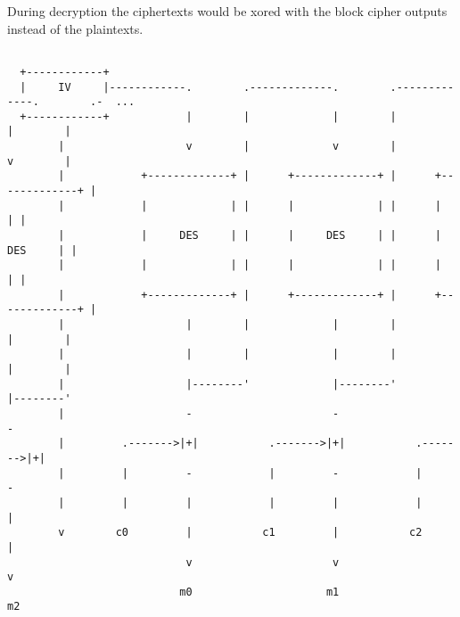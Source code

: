 \documentclass{article}
\begin{document}
\normalsize
During decryption the ciphertexts would be xored with the block cipher outputs instead of the plaintexts.
\small
\begin{verbatim}

  +------------+                                                   
  |     IV     |------------.        .-------------.        .-------------.        .-  ...                                                                      
  +------------+            |        |             |        |             |        |                                                    
        |                   v        |             v        |             v        |                                                      
        |            +-------------+ |      +-------------+ |      +-------------+ |                                                
        |            |             | |      |             | |      |             | |                                                    
        |            |     DES     | |      |     DES     | |      |     DES     | |                                                      
        |            |             | |      |             | |      |             | |                                                    
        |            +-------------+ |      +-------------+ |      +-------------+ |                                                  
        |                   |        |             |        |             |        |                                                   
        |                   |        |             |        |             |        |                                                   
        |                   |--------'             |--------'             |--------'                                                   
        |                   -                      -                      -                                                                
        |         .------->|+|           .------->|+|           .------->|+|                                                             
        |         |         -            |         -            |         -                                                            
        |         |         |            |         |            |         |                                                             
        v        c0         |           c1         |           c2         |                                                               
                            v                      v                      v                                                          
                           m0                     m1                     m2                                                          
\end{verbatim}
\normalsize
\end{document}
